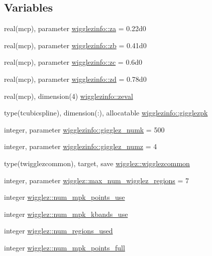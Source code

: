 \subsection*{Variables}
\begin{DoxyCompactItemize}
\item 
real(mcp), parameter \mbox{\hyperlink{namespacewigglezinfo_a5ee76ba0ebd66c8881b0128f64a73b98}{wigglezinfo\+::za}} = 0.\+22d0
\item 
real(mcp), parameter \mbox{\hyperlink{namespacewigglezinfo_a0caef290cd3d8b7306771479bd8589e5}{wigglezinfo\+::zb}} = 0.\+41d0
\item 
real(mcp), parameter \mbox{\hyperlink{namespacewigglezinfo_a6079d8a819afcd264b152ce14b1c9524}{wigglezinfo\+::zc}} = 0.\+6d0
\item 
real(mcp), parameter \mbox{\hyperlink{namespacewigglezinfo_aba81e5054787627511da43db2cab3e05}{wigglezinfo\+::zd}} = 0.\+78d0
\item 
real(mcp), dimension(4) \mbox{\hyperlink{namespacewigglezinfo_a8d9180a8b6d6e2d0fee91ed2c96901d1}{wigglezinfo\+::zeval}}
\item 
type(tcubicspline), dimension(\+:), allocatable \mbox{\hyperlink{namespacewigglezinfo_a6e6d78669da0432fe3a6e39caaf60e4c}{wigglezinfo\+::gigglezpk}}
\item 
integer, parameter \mbox{\hyperlink{namespacewigglezinfo_aeea1af41c9bde44daa886428c2d864af}{wigglezinfo\+::gigglez\+\_\+numk}} = 500
\item 
integer, parameter \mbox{\hyperlink{namespacewigglezinfo_a4a6cdfc8a72a4b74579fed9741cd9d05}{wigglezinfo\+::gigglez\+\_\+numz}} = 4
\item 
type(twigglezcommon), target, save \mbox{\hyperlink{namespacewigglez_a1a7784e6e8553a1ae1cf8a3eb8276341}{wigglez\+::wigglezcommon}}
\item 
integer, parameter \mbox{\hyperlink{namespacewigglez_a8d5cc17b3425207c6850325bc82a93a5}{wigglez\+::max\+\_\+num\+\_\+wigglez\+\_\+regions}} = 7
\item 
integer \mbox{\hyperlink{namespacewigglez_af0a2aa38606b250dcb980ccb92fc11ca}{wigglez\+::num\+\_\+mpk\+\_\+points\+\_\+use}}
\item 
integer \mbox{\hyperlink{namespacewigglez_ac9ec4f774e0116431ec283376d04fa35}{wigglez\+::num\+\_\+mpk\+\_\+kbands\+\_\+use}}
\item 
integer \mbox{\hyperlink{namespacewigglez_a31d03f56c463d2ce29e24a2d5b1ac7b1}{wigglez\+::num\+\_\+regions\+\_\+used}}
\item 
integer \mbox{\hyperlink{namespacewigglez_a958f6e7ea41ba27bf96a9d39f3a9b52b}{wigglez\+::num\+\_\+mpk\+\_\+points\+\_\+full}}

\end{DoxyCompactItemize}

